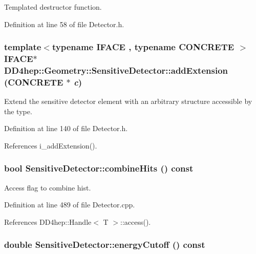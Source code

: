 Templated destructor function. 

Definition at line 58 of file Detector.h.\hypertarget{class_d_d4hep_1_1_geometry_1_1_sensitive_detector_aa7ac8b6ab4edba549e70596ab1fdd6d5}{
\subsubsection[{addExtension}]{\setlength{\rightskip}{0pt plus 5cm}template$<$typename IFACE , typename CONCRETE $>$ IFACE$\ast$ DD4hep::Geometry::SensitiveDetector::addExtension (CONCRETE $\ast$ {\em c})}}
\label{class_d_d4hep_1_1_geometry_1_1_sensitive_detector_aa7ac8b6ab4edba549e70596ab1fdd6d5}


Extend the sensitive detector element with an arbitrary structure accessible by the type. 

Definition at line 140 of file Detector.h.

References i\_\-addExtension().\hypertarget{class_d_d4hep_1_1_geometry_1_1_sensitive_detector_abaf71c3bc08b34c07e7a492e4e9c1b98}{
\subsubsection[{combineHits}]{\setlength{\rightskip}{0pt plus 5cm}bool SensitiveDetector::combineHits () const}}
\label{class_d_d4hep_1_1_geometry_1_1_sensitive_detector_abaf71c3bc08b34c07e7a492e4e9c1b98}


Access flag to combine hist. 

Definition at line 489 of file Detector.cpp.

References DD4hep::Handle$<$ T $>$::access().\hypertarget{class_d_d4hep_1_1_geometry_1_1_sensitive_detector_a07ed75fb993527ca9b2bc23e720c4098}{
\subsubsection[{energyCutoff}]{\setlength{\rightskip}{0pt plus 5cm}double SensitiveDetector::energyCutoff () const}}
\label{class_d_d4hep_1_1_geometry_1_1_sensitive_detector_a07ed75fb993527ca9b2bc23e720c4098}


